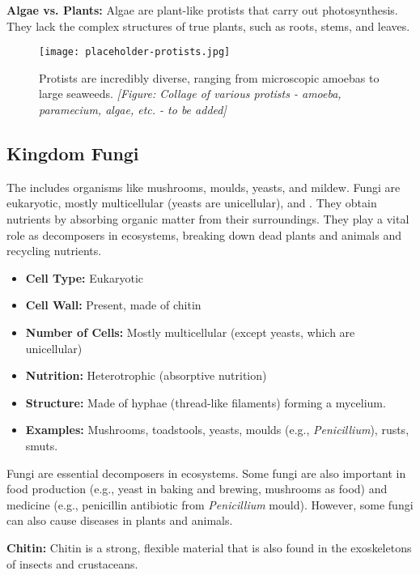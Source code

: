 \begin{marginnote}
\textbf{Algae vs. Plants:} Algae are plant-like protists that carry out photosynthesis.  They lack the complex structures of true plants, such as roots, stems, and leaves.
\end{marginnote}

\begin{figure}
\centering
\texttt{[image: placeholder-protists.jpg]}
\caption{Protists are incredibly diverse, ranging from microscopic amoebas to large seaweeds. \textit{[Figure: Collage of various protists - amoeba, paramecium, algae, etc. - to be added]}}
\end{figure}


\subsection{Kingdom Fungi}

The  includes organisms like mushrooms, moulds, yeasts, and mildew. Fungi are eukaryotic, mostly multicellular (yeasts are unicellular), and .  They obtain nutrients by absorbing organic matter from their surroundings.  They play a vital role as decomposers in ecosystems, breaking down dead plants and animals and recycling nutrients.

\begin{itemize}
    \item \textbf{Cell Type:} Eukaryotic
    \item \textbf{Cell Wall:} Present, made of chitin
    \item \textbf{Number of Cells:} Mostly multicellular (except yeasts, which are unicellular)
    \item \textbf{Nutrition:} Heterotrophic (absorptive nutrition)
    \item \textbf{Structure:} Made of hyphae (thread-like filaments) forming a mycelium.
    \item \textbf{Examples:} Mushrooms, toadstools, yeasts, moulds (e.g., \textit{Penicillium}), rusts, smuts.
\end{itemize}

Fungi are essential decomposers in ecosystems. Some fungi are also important in food production (e.g., yeast in baking and brewing, mushrooms as food) and medicine (e.g., penicillin antibiotic from \textit{Penicillium} mould).  However, some fungi can also cause diseases in plants and animals.

\begin{marginnote}
\textbf{Chitin:} Chitin is a strong, flexible material that is also found in the exoskeletons of insects and crustaceans.
\end{marginnote}

